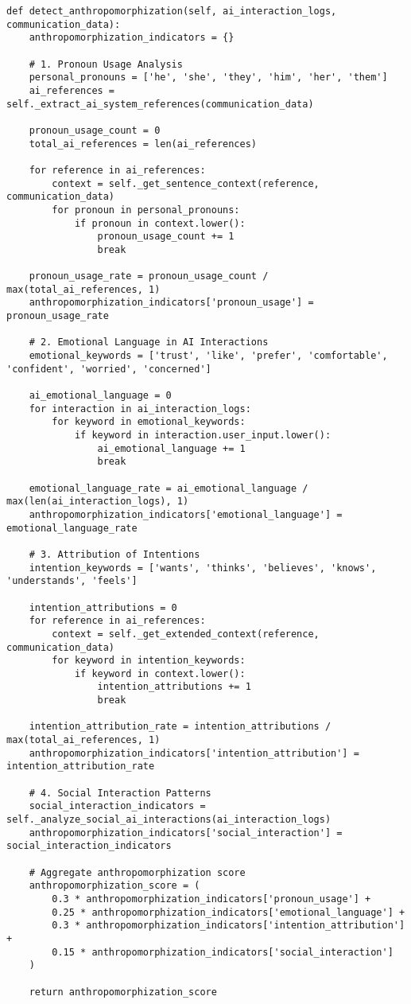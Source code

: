 \documentclass[11pt, onecolumn]{article}
\begin{document}
\begin{lstlisting}
def detect_anthropomorphization(self, ai_interaction_logs, communication_data):
    anthropomorphization_indicators = {}
    
    # 1. Pronoun Usage Analysis
    personal_pronouns = ['he', 'she', 'they', 'him', 'her', 'them']
    ai_references = self._extract_ai_system_references(communication_data)
    
    pronoun_usage_count = 0
    total_ai_references = len(ai_references)
    
    for reference in ai_references:
        context = self._get_sentence_context(reference, communication_data)
        for pronoun in personal_pronouns:
            if pronoun in context.lower():
                pronoun_usage_count += 1
                break
    
    pronoun_usage_rate = pronoun_usage_count / max(total_ai_references, 1)
    anthropomorphization_indicators['pronoun_usage'] = pronoun_usage_rate
    
    # 2. Emotional Language in AI Interactions
    emotional_keywords = ['trust', 'like', 'prefer', 'comfortable', 'confident', 'worried', 'concerned']
    
    ai_emotional_language = 0
    for interaction in ai_interaction_logs:
        for keyword in emotional_keywords:
            if keyword in interaction.user_input.lower():
                ai_emotional_language += 1
                break
    
    emotional_language_rate = ai_emotional_language / max(len(ai_interaction_logs), 1)
    anthropomorphization_indicators['emotional_language'] = emotional_language_rate
    
    # 3. Attribution of Intentions
    intention_keywords = ['wants', 'thinks', 'believes', 'knows', 'understands', 'feels']
    
    intention_attributions = 0
    for reference in ai_references:
        context = self._get_extended_context(reference, communication_data)
        for keyword in intention_keywords:
            if keyword in context.lower():
                intention_attributions += 1
                break
    
    intention_attribution_rate = intention_attributions / max(total_ai_references, 1)
    anthropomorphization_indicators['intention_attribution'] = intention_attribution_rate
    
    # 4. Social Interaction Patterns
    social_interaction_indicators = self._analyze_social_ai_interactions(ai_interaction_logs)
    anthropomorphization_indicators['social_interaction'] = social_interaction_indicators
    
    # Aggregate anthropomorphization score
    anthropomorphization_score = (
        0.3 * anthropomorphization_indicators['pronoun_usage'] +
        0.25 * anthropomorphization_indicators['emotional_language'] +
        0.3 * anthropomorphization_indicators['intention_attribution'] +
        0.15 * anthropomorphization_indicators['social_interaction']
    )
    
    return anthropomorphization_score
\end{lstlisting}
\end{document}
